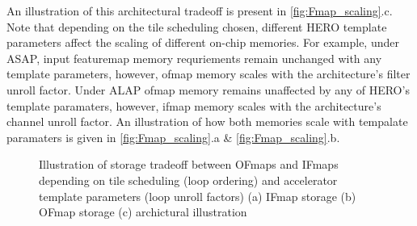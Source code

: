 An illustration of this architectural tradeoff is present
in \autoref{fig:Fmap_scaling}.c. Note that depending on the tile scheduling
chosen, different HERO template parameters affect the scaling of different
on-chip memories. For example, under ASAP, input featuremap memory requriements
remain unchanged with any template parameters, however, ofmap memory scales
with the architecture's filter unroll factor. Under ALAP ofmap memory remains
unaffected by any of HERO's template paramaters, however, ifmap memory scales
with the architecture's channel unroll factor. An illustration of how both
memories scale with tempalate paramaters is given in
\autoref{fig:Fmap_scaling}.a \& \autoref{fig:Fmap_scaling}.b. 

\begin{figure}
    \centering
    \hspace{0.1cm} 
    \caption{Illustration of storage tradeoff between OFmaps and IFmaps depending on tile scheduling (loop ordering) and accelerator template parameters (loop unroll factors) (a) IFmap storage (b) OFmap storage (c) archictural illustration}
    \label{fig:Fmap_scaling}
\end{figure}

